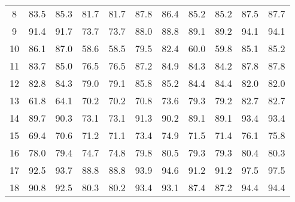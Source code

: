 \documentclass{article} \usepackage{iclr2021_conference,times}
\begin{document}
\begin{table}[ht]
{\begin{tabular}{c|c|c|c|c|c|c|c|c|c|c}
        8 & 83.5{\scriptsize} & 85.3{\scriptsize} & 81.7{\scriptsize} & 81.7{\scriptsize} & 87.8{\scriptsize} & 86.4{\scriptsize} & 85.2{\scriptsize} & 85.2{\scriptsize} & 87.5{\scriptsize} & 87.7{\scriptsize} \\
        9 & 91.4{\scriptsize} & 91.7{\scriptsize} & 73.7{\scriptsize} & 73.7{\scriptsize} & 88.0{\scriptsize} & 88.8{\scriptsize} & 89.1{\scriptsize} & 89.2{\scriptsize} & 94.1{\scriptsize} & 94.1{\scriptsize} \\
        10 & 86.1{\scriptsize} & 87.0{\scriptsize} & 58.6{\scriptsize} & 58.5{\scriptsize} & 79.5{\scriptsize} & 82.4{\scriptsize} & 60.0{\scriptsize} & 59.8{\scriptsize} & 85.1{\scriptsize} & 85.2{\scriptsize} \\
        11 & 83.7{\scriptsize} & 85.0{\scriptsize} & 76.5{\scriptsize} & 76.5{\scriptsize} & 87.2{\scriptsize} & 84.9{\scriptsize} & 84.3{\scriptsize} & 84.2{\scriptsize} & 87.8{\scriptsize} & 87.8{\scriptsize} \\
        12 & 82.8{\scriptsize} & 84.3{\scriptsize} & 79.0{\scriptsize} & 79.1{\scriptsize} & 85.8{\scriptsize} & 85.2{\scriptsize} & 84.4{\scriptsize} & 84.4{\scriptsize} & 82.0{\scriptsize} & 82.0{\scriptsize} \\
        13 & 61.8{\scriptsize} & 64.1{\scriptsize} & 70.2{\scriptsize} & 70.2{\scriptsize} & 70.8{\scriptsize} & 73.6{\scriptsize} & 79.3{\scriptsize} & 79.2{\scriptsize} & 82.7{\scriptsize} & 82.7{\scriptsize} \\
        14 & 89.7{\scriptsize} & 90.3{\scriptsize} & 73.1{\scriptsize} & 73.1{\scriptsize} & 91.3{\scriptsize} & 90.2{\scriptsize} & 89.1{\scriptsize} & 89.1{\scriptsize} & 93.4{\scriptsize} & 93.4{\scriptsize} \\
        15 & 69.4{\scriptsize} & 70.6{\scriptsize} & 71.2{\scriptsize} & 71.1{\scriptsize} & 73.4{\scriptsize} & 74.9{\scriptsize} & 71.5{\scriptsize} & 71.4{\scriptsize} & 76.1{\scriptsize} & 75.8{\scriptsize} \\
        16 & 78.0{\scriptsize} & 79.4{\scriptsize} & 74.7{\scriptsize} & 74.8{\scriptsize} & 79.8{\scriptsize} & 80.5{\scriptsize} & 79.3{\scriptsize} & 79.3{\scriptsize} & 80.4{\scriptsize} & 80.3{\scriptsize} \\
        17 & 92.5{\scriptsize} & 93.7{\scriptsize} & 88.8{\scriptsize} & 88.8{\scriptsize} & 93.9{\scriptsize} & 94.6{\scriptsize} & 91.2{\scriptsize} & 91.2{\scriptsize} & 97.5{\scriptsize} & 97.5{\scriptsize} \\
        18 & 90.8{\scriptsize} & 92.5{\scriptsize} & 80.3{\scriptsize} & 80.2{\scriptsize} & 93.4{\scriptsize} & 93.1{\scriptsize} & 87.4{\scriptsize} & 87.2{\scriptsize} & 94.4{\scriptsize} & 94.4{\scriptsize} \\

\end{tabular}}
\end{table}
\end{document}
